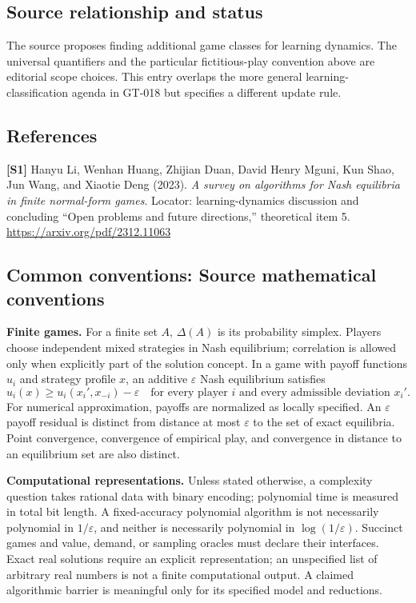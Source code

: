 \documentclass[11pt,a4paper]{article}
\begin{document}
\subsection*{Source relationship and status}
The source proposes finding additional game classes for learning dynamics. The universal quantifiers and the particular fictitious-play convention above are editorial scope choices. This entry overlaps the more general learning-classification agenda in GT-018 but specifies a different update rule.
\subsection*{References}
\begingroup\footnotesize\raggedright
{\footnotesize\raggedright
\textbf{[S1]} Hanyu Li, Wenhan Huang, Zhijian Duan, David Henry Mguni, Kun Shao, Jun Wang, and Xiaotie Deng (2023). \emph{A survey on algorithms for Nash equilibria in finite normal-form games}. Locator: learning-dynamics discussion and concluding ``Open problems and future directions,'' theoretical item 5. \url{https://arxiv.org/pdf/2312.11063}\par}
\par\endgroup

\subsection*{Common conventions: Source mathematical conventions}

\textbf{Finite games.} For a finite set $A$, $\Delta(A)$ is its probability
simplex. Players choose independent mixed strategies in Nash equilibrium;
correlation is allowed only when explicitly part of the solution concept.
In a game with payoff functions $u_i$ and strategy profile $x$, an additive
$\varepsilon$ Nash equilibrium satisfies
\[
 u_i(x)\geq u_i(x_i',x_{-i})-\varepsilon
 \quad\text{for every player $i$ and every admissible deviation $x_i'$}.
\]
For numerical approximation, payoffs are normalized as locally specified.
An $\varepsilon$ payoff residual is distinct from distance at most
$\varepsilon$ to the set of exact equilibria. Point convergence, convergence
of empirical play, and convergence in distance to an equilibrium set are
also distinct.

\textbf{Computational representations.} Unless stated otherwise, a complexity
question takes rational data with binary encoding; polynomial time is measured
in total bit length. A fixed-accuracy polynomial algorithm is not necessarily
polynomial in $1/\varepsilon$, and neither is necessarily polynomial in
$\log(1/\varepsilon)$. Succinct games and value, demand, or sampling oracles
must declare their interfaces. Exact real solutions require an explicit
representation; an unspecified list of arbitrary real numbers is not a
finite computational output. A claimed algorithmic barrier is meaningful
only for its specified model and reductions.
\end{document}
